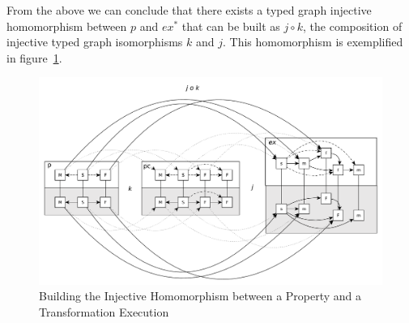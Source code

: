 \begin{pf}
From the above we can conclude that there exists a typed graph injective
homomorphism between $p$ and $ex^*$ that can be built as $j\circ k$, the
composition of injective typed graph isomorphisms $k$ and $j$. This homomorphism is exemplified in figure~\ref{fig:proof_example_morphism_composition}.

\begin{figure}[h!] \centering \includegraphics[scale=.35]{./figures/property_proving/proof_example_morphism_composition.pdf}
	\caption{Building the Injective Homomorphism between a Property and a Transformation Execution}
	\label{fig:proof_example_morphism_composition}
\end{figure}
\end{pf}

